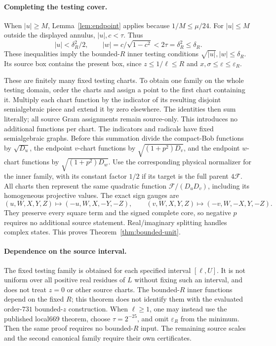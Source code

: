 \documentclass[11pt]{article}
\begin{document}
\paragraph{Completing the testing cover.}
When $|u|\ge M$, Lemma~\ref{lem:endpoint} applies because
$1/M\le\mu/24$. For $|u|\le M$ outside the displayed annulus,
$|u|,c<\tau$. Thus
\[
 |u|<\delta_R^2/2,\qquad
 |w|=c/\sqrt{1-c^2}<2\tau=\delta_R^2\le\delta_R.
\]
These inequalities imply the bounded-$R$ inner testing conditions
$\sqrt{|u|},|w|\le\delta_R$. Its source box contains the present box,
since $z\le1/\ell\le R$ and $x,\sigma\le\varepsilon\le\varepsilon_R$.

These are finitely many fixed testing charts. To obtain one family
on the whole testing domain, order the charts and assign a point to
the first chart containing it. Multiply each chart function by the
indicator of its resulting disjoint semialgebraic piece and extend it
by zero elsewhere. The identities then sum literally; all source
Gram assignments remain source-only. This introduces no additional
functions per chart. The indicators and radicals have fixed
semialgebraic graphs. Before this summation divide the compact-Bob
functions by $\sqrt{D_u}$, the endpoint $v$-chart functions by
$\sqrt{(1+p^2)D_v}$, and the endpoint $w$-chart functions by
$\sqrt{(1+p^2)D_w}$. Use the corresponding physical normalizer for
the inner family, with its constant factor $1/2$ if its target is
the full parent $4\mathcal F$. All charts then represent the same
quadratic function $\mathcal F/(D_uD_v)$, including its homogeneous
projective values. The exact sign gauges are
\[
 (u,W,X,Y,Z)\longmapsto(-u,W,X,-Y,-Z),\qquad
 (v,W,X,Y,Z)\longmapsto(-v,W,-X,Y,-Z).
\]
They preserve every square term and the signed complete core, so
negative $p$ requires no additional source statement.
Real/imaginary splitting handles complex
states. This proves Theorem~\ref{thm:bounded-unit}.

\paragraph{Dependence on the source interval.}
The fixed testing family is obtained for each specified interval
$[\ell,U]$. It is not uniform over all positive real residues of $L$
without fixing such an interval, and does not treat $z=0$ or other
source charts. The bounded-$R$ inner functions depend on the fixed $R$;
this theorem does not identify them with the evaluated order-$731$
bounded-$z$ construction.
When $\ell\ge1$, one may instead use the published local669 theorem,
choose $\tau=2^{-25}$, and omit $\varepsilon_R$ from the minimum.
Then the same proof requires no bounded-$R$ input.
The remaining source scales and the second canonical family require
their own certificates.
\end{document}
